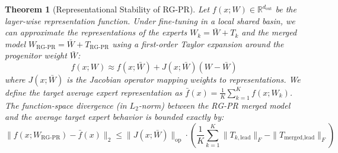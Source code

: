 \documentclass{article}
\theoremstyle{plain}
\newtheorem*{theorem*}{Theorem}
\theoremstyle{definition}
\theoremstyle{remark}
\begin{document}
\begin{theorem*}[Representational Stability of RG-PR]
Let $f(x; W) \in \mathbb{R}^{d_{\text{out}}}$ be the layer-wise representation function. Under fine-tuning in a local shared basin, we can approximate the representations of the experts $W_k = \bar{W} + T_k$ and the merged model $W_{\text{RG-PR}} = \bar{W} + T_{\text{RG-PR}}$ using a first-order Taylor expansion around the progenitor weight $\bar{W}$:
\begin{equation}
    f(x; W) \approx f(x; \bar{W}) + J(x; \bar{W}) (W - \bar{W})
\end{equation}
where $J(x; \bar{W})$ is the Jacobian operator mapping weights to representations. We define the target average expert representation as $\bar{f}(x) = \frac{1}{K} \sum_{k=1}^K f(x; W_k)$.
The function-space divergence (in $L_2$-norm) between the RG-PR merged model and the average target expert behavior is bounded exactly by:
\begin{equation}
    \| f(x; W_{\text{RG-PR}}) - \bar{f}(x) \|_2 \le \| J(x; \bar{W}) \|_{\text{op}} \cdot \left( \frac{1}{K} \sum_{k=1}^K \| T_{k, \text{lead}} \|_F - \| T_{\text{merged}, \text{lead}} \|_F \right)
\end{equation}
\end{theorem*}
\end{document}
